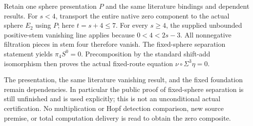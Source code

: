 \begin{proposition}
  \label{prop:lin-eta-nu-from-stem-four}
  \notready
  Retain one sphere presentation $P$ and the same literature bindings
  and dependent results. For $s<4$, transport the entire native zero
  component to the actual sphere $E_2$ using $P$; here $t=s+4\le7$.
  For every $s\ge4$, the supplied unbounded positive-stem vanishing line
  applies because $0<4<2s-3$. All nonnegative filtration pieces in stem
  four therefore vanish. The fixed-sphere separation statement yields
  $\pi_4S^0=0$. Precomposition by the standard shift-add isomorphism
  then proves the actual fixed-route equation $\nu\circ\Sigma^3\eta=0$.

  The presentation, the same literature vanishing result, and the fixed
  foundation remain dependencies. In particular the public proof of
  fixed-sphere separation is still unfinished and is used explicitly;
  this is not an unconditional actual certification. No multiplication
  or Hopf detection comparison, new source premise, or total computation
  delivery is read to obtain the zero composite.
\end{proposition}


